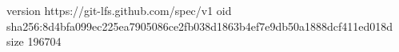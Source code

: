 version https://git-lfs.github.com/spec/v1
oid sha256:8d4bfa099ec225ea7905086ce2fb038d1863b4ef7e9db50a1888dcf411ed018d
size 196704
